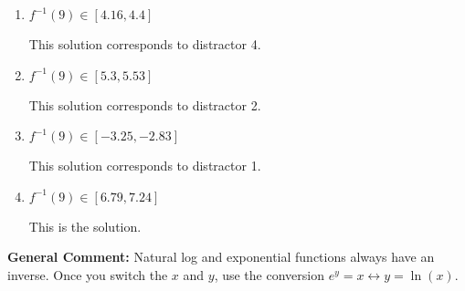 \documentclass{extbook}[14pt]
\begin{document}
\begin{enumerate}
{\begin{enumerate}[label=\Alph*.]
 This solution corresponds to distractor 3.
\item \( f^{-1}(9) \in [4.16, 4.4] \)

 This solution corresponds to distractor 4.
\item \( f^{-1}(9) \in [5.3, 5.53] \)

 This solution corresponds to distractor 2.
\item \( f^{-1}(9) \in [-3.25, -2.83] \)

 This solution corresponds to distractor 1.
\item \( f^{-1}(9) \in [6.79, 7.24] \)

 This is the solution.
\end{enumerate}

\textbf{General Comment:} Natural log and exponential functions always have an inverse. Once you switch the $x$ and $y$, use the conversion $ e^y = x \leftrightarrow y=\ln(x)$.
}
\end{enumerate}
\end{document}
